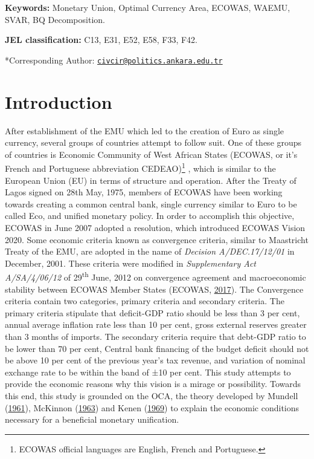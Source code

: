 \documentclass[]{article}
\let\rmarkdownfootnote\footnote%
\def\footnote{\protect\rmarkdownfootnote}
\begin{document}
\textbf{Keywords:} Monetary Union, Optimal Currency Area, ECOWAS, WAEMU, SVAR, \ac{BQ} Decomposition.

\textbf{JEL classification:} C13, E31, E52, E58, F33, F42.

\vskip60pt

\hrulefill

*Corresponding Author: \href{mailto:civcir@politics.ankara.edu.tr}{\nolinkurl{civcir@politics.ankara.edu.tr}}
\clearpage
\pagestyle{plain}

\hypertarget{introduction}{%
\section{Introduction}\label{introduction}}

After establishment of the  \ac{EMU} which led to the creation of Euro as single currency, several groups of countries attempt to follow suit. One of these groups of countries is Economic Community of West African States (ECOWAS, or it's French and Portuguese abbreviation CEDEAO)\footnote{ECOWAS official languages are English, French and Portuguese.} , which is similar to the European Union (EU) in terms of structure and operation. After the Treaty of Lagos signed on 28th May, 1975, members of ECOWAS have been working towards creating a common central bank, single currency similar to Euro to be called Eco, and unified monetary policy. In order to accomplish this objective, ECOWAS in June 2007 adopted a resolution, which introduced ECOWAS Vision 2020. Some economic criteria known as convergence criteria, similar to Maastricht Treaty of the EMU, are adopted in the name of \emph{Decision A/DEC.17/12/01} in December, 2001. These criteria were modified in \emph{Supplementary Act A/SA/4/06/12} of 29\textsuperscript{th} June, 2012 on convergence agreement and macroeconomic stability between ECOWAS Member States (ECOWAS, \protect\hyperlink{ref-ECOWAS2017}{2017}). The Convergence criteria contain two categories, primary criteria and secondary criteria. The primary criteria stipulate that deficit-GDP ratio should be less than 3 per cent, annual average inflation rate less than 10 per cent, gross external reserves greater than 3 months of imports. The secondary criteria require that debt-GDP ratio to be lower than 70 per cent, Central bank financing of the budget deficit should not be above 10 per cent of the previous year's tax revenue, and variation of nominal exchange rate to be within the band of ±10 per cent. This study attempts to provide the economic reasons why this vision is a mirage or possibility. Towards this end, this study is grounded on the  \ac{OCA}, the theory developed by Mundell (\protect\hyperlink{ref-mundell1961theory}{1961}), McKinnon (\protect\hyperlink{ref-McKinnon1963}{1963}) and Kenen (\protect\hyperlink{ref-kenen1969theory}{1969}) to explain the economic conditions necessary for a beneficial monetary unification.
\end{document}
